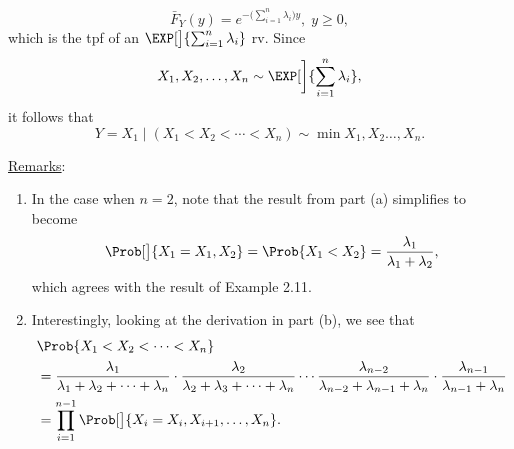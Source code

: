 \begin{Example}
\begin{enumerate}[(a)]
              \[ \bar{F}_Y(y)=e^{-\bigl(\sum_{i=1}^{n}\lambda_i\bigr)y},\; y\ge 0, \]
              which is the tpf of an $ \EXP[\big]{\sum_{i=1}^{n}\lambda_i} $ rv. Since
              \[ \min{X_1,X_2,\ldots,X_n}\sim \EXP[\bigg]{\sum_{i=1}^{n}\lambda_i}, \]
              it follows that
              \[ Y=X_1\mid(X_1<X_2<\cdots<X_n)\sim \min{X_1,X_2\ldots,X_n}. \]
    \end{enumerate}
    \tcblower{}
    \underline{Remarks}:
    \begin{enumerate}[(1)]
        \item In the case when $ n=2 $, note that the result from part (a) simplifies to become
              \[ \Prob[\big]{X_1=\min{X_1,X_2}}=\Prob{X_1<X_2}=\frac{\lambda_1}{\lambda_1+\lambda_2}, \]
              which agrees with the result of Example 2.11.
        \item Interestingly, looking at the derivation in part (b), we see that
              \begin{align*}
                   & \Prob{X_1<X_2<\cdots<X_n}                                                                                                 \\
                   & =\frac{\lambda_1}{\lambda_1+\lambda_2+\cdots+\lambda_n}\cdot \frac{\lambda_2}{\lambda_2+\lambda_3+\cdots+\lambda_n}\cdots
                  \frac{\lambda_{n-2}}{\lambda_{n-2}+\lambda_{n-1}+\lambda_n}\cdot \frac{\lambda_{n-1}}{\lambda_{n-1}+\lambda_n}               \\
                   & =\prod_{i=1}^{n-1}\Prob[\big]{X_i=\min{X_i,X_{i+1},\ldots,X_n}}.
              \end{align*}
    \end{enumerate}
\end{Example}
